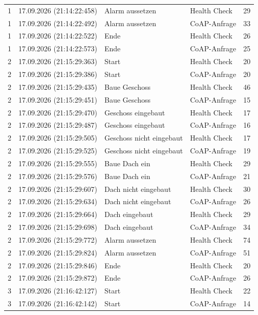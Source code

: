 {\begin{longtable}{|c|l|>{\raggedright\arraybackslash}p{4.2cm}|l|r|}
1 & 17.09.2026 (21:14:22:458) & Alarm aussetzen & Health Check & 29 \\
1 & 17.09.2026 (21:14:22:492) & Alarm aussetzen & CoAP-Anfrage & 33 \\
1 & 17.09.2026 (21:14:22:522) & Ende & Health Check & 26 \\
1 & 17.09.2026 (21:14:22:573) & Ende & CoAP-Anfrage & 25 \\
2 & 17.09.2026 (21:15:29:363) & Start & Health Check & 20 \\
2 & 17.09.2026 (21:15:29:386) & Start & CoAP-Anfrage & 20 \\
2 & 17.09.2026 (21:15:29:435) & Baue Geschoss & Health Check & 46 \\
2 & 17.09.2026 (21:15:29:451) & Baue Geschoss & CoAP-Anfrage & 15 \\
2 & 17.09.2026 (21:15:29:470) & Geschoss eingebaut & Health Check & 17 \\
2 & 17.09.2026 (21:15:29:487) & Geschoss eingebaut & CoAP-Anfrage & 16 \\
2 & 17.09.2026 (21:15:29:505) & Geschoss nicht eingebaut & Health Check & 17 \\
2 & 17.09.2026 (21:15:29:525) & Geschoss nicht eingebaut & CoAP-Anfrage & 19 \\
2 & 17.09.2026 (21:15:29:555) & Baue Dach ein & Health Check & 29 \\
2 & 17.09.2026 (21:15:29:576) & Baue Dach ein & CoAP-Anfrage & 21 \\
2 & 17.09.2026 (21:15:29:607) & Dach nicht eingebaut & Health Check & 30 \\
2 & 17.09.2026 (21:15:29:634) & Dach nicht eingebaut & CoAP-Anfrage & 26 \\
2 & 17.09.2026 (21:15:29:664) & Dach eingebaut & Health Check & 29 \\
2 & 17.09.2026 (21:15:29:698) & Dach eingebaut & CoAP-Anfrage & 34 \\
2 & 17.09.2026 (21:15:29:772) & Alarm aussetzen & Health Check & 74 \\
2 & 17.09.2026 (21:15:29:824) & Alarm aussetzen & CoAP-Anfrage & 51 \\
2 & 17.09.2026 (21:15:29:846) & Ende & Health Check & 20 \\
2 & 17.09.2026 (21:15:29:872) & Ende & CoAP-Anfrage & 26 \\
3 & 17.09.2026 (21:16:42:127) & Start & Health Check & 22 \\
3 & 17.09.2026 (21:16:42:142) & Start & CoAP-Anfrage & 14 \\

\end{longtable}}

